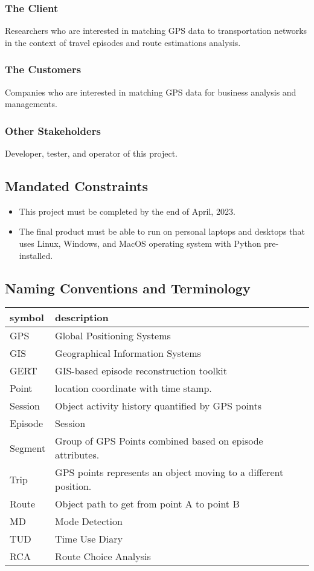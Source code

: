 \documentclass[12pt, titlepage]{article}
\begin{document}
\subsubsection{The Client}
Researchers who are interested in matching GPS data to transportation networks in the context of travel episodes and route estimations analysis.

\subsubsection{The Customers}
Companies who are interested in matching GPS data for business analysis and managements.

\subsubsection{Other Stakeholders}
Developer, tester, and operator of this project.

\subsection{Mandated Constraints}
\begin{itemize}
    \item This project must be completed by the end of April, 2023.
    \item The final product must be able to run on personal laptops and desktops that uses Linux, Windows, and MacOS operating system with Python pre-installed.
\end{itemize}

\subsection{Naming Conventions and Terminology}
\begin{tabular}{l l} 
  \toprule		
  \textbf{symbol} & \textbf{description}\\
  \midrule 
  GPS & Global Positioning Systems\\
  GIS & Geographical Information Systems\\
  GERT & GIS-based episode reconstruction toolkit \\
  Point & location coordinate with time stamp.\\
  Session & Object activity history quantified by GPS points \\
  Episode & Session\\
  Segment & Group of GPS Points combined based on episode attributes.\\
  Trip & GPS points represents an object moving to a different position.\\
  Route & Object path to get from point A to point B\\
  MD & Mode Detection \\
  TUD & Time Use Diary \\
  RCA & Route Choice Analysis \\
  \bottomrule
\end{tabular}\\
\end{document}

